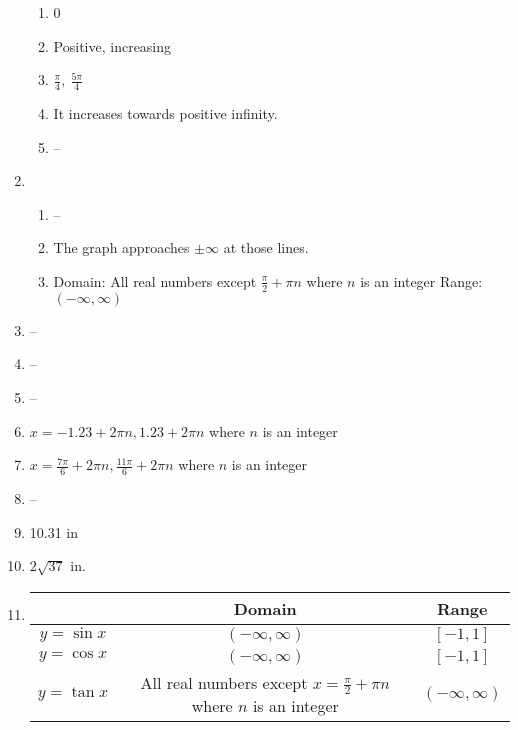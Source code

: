 \documentclass{article}
\begin{document}
\begin{enumerate}
	\begin{enumerate}
	
	\item 0
	
	\item Positive, increasing
	
	\item $\frac{\pi}{4}, \ \frac{5\pi}{4}$
	
	\item It increases towards positive infinity.
	
	\item --
	
	\end{enumerate}
	
\item

	\begin{enumerate}
	
	\item --
	
	\item The graph approaches $\pm \infty$ at those lines.
	
	\item Domain: All real numbers except $\frac{\pi}{2} + \pi n$ where $n$ is an integer \newline
		Range: $(-\infty, \infty)$
	
	\end{enumerate}

\item --

\item --

\item --
	
\item $x = -1.23 + 2\pi n, 1.23 + 2\pi n$ where $n$ is an integer

\item $x = \frac{7\pi}{6} + 2\pi n, \frac{11\pi}{6} + 2 \pi n$ where $n$ is an integer

\item --

\item 10.31 in

\item $2 \sqrt{37}$ in.

\item

	\begin{tabular}{| c | c | c |}
	
	\hline
	& Domain & Range \\
	\hline
	$y = \sin{x}$ & $(-\infty, \infty)$ & $[-1,1]$ \\
	\hline
	$y = \cos{x}$ & $(-\infty, \infty)$ & $[-1, 1]$ \\
	\hline
	$y = \tan{x}$ & All real numbers except $x = \frac{\pi}{2} + \pi n$ where $n$ is an integer & $(-\infty, \infty)$ \\
	\hline
	

\end{tabular}
\end{enumerate}
\end{document}
